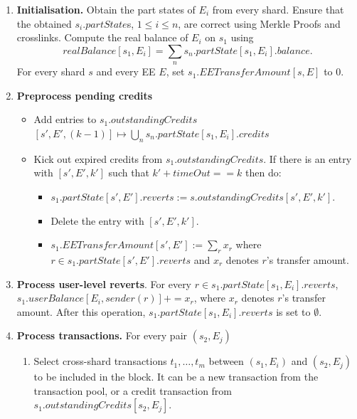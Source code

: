 \documentclass{article}
\begin{document}
\begin{enumerate}
\item {\bf Initialisation.} Obtain the part states of $E_i$ from every shard. Ensure that the obtained $s_i.partState$s,  $1 \le i \le n$, are correct using Merkle Proofs and crosslinks.
Compute the real balance of $E_i$ on $s_1$ using 
\[
	realBalance[s_1,E_i] = \sum_n s_n.partState[s_1,E_i].balance.
\]
For every shard $s$ and every EE $E$, set $s_1.EETransferAmount[s,E]$ to $0$.

\item {\bf Preprocess pending credits}
    \begin{itemize}
        \item Add entries to $s_1.outstandingCredits$
        $[s', E', (k-1)] \mapsto \bigcup_n s_n.partState[s_1,E_i].credits$
        \item Kick out expired credits from $s_1.outstandingCredits$. If there is an entry with $[s',E',k']$ such that $k' + timeOut == k$ then do:
        \begin{itemize}
            \item $s_1.partState[s',E'].reverts := s.outstandingCredits[s', E', k']$.
            \item Delete the entry with $[s', E', k']$.
			\item $s_1.EETransferAmount[s',E'] := \sum_r x_r$ where \\
			$r \in s_1.partState[s',E'].reverts$ and $x_r$ denotes $r$'s transfer amount.
        \end{itemize}
	\end{itemize}
	
\item {\bf Process user-level reverts}. For every $r \in s_1.partState[s_1,E_i].reverts$, $s_1.userBalance[E_i,sender(r)] += x_r$, where $x_r$ denotes $r$'s transfer amount. After this operation, $s_1.partState[s_1,E_i].reverts$ is set to $\emptyset$.


\item {\bf Process transactions.} For every pair $(s_2,E_j)$
    \begin{enumerate}
	\item Select cross-shard transactions $t_1,\ldots,t_m$ between $(s_1,E_i)$ and $(s_2,E_j)$ to be included in the block. It can be a new transaction from the transaction pool, or a credit transaction from $s_1.outstandingCredits[s_2,E_j]$. 
	

\end{enumerate}
\end{enumerate}
\end{document}
